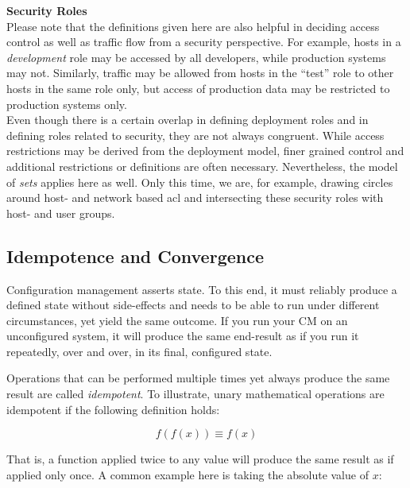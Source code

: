 \begin{sidenote}
{\bf Security Roles} \\

Please note that the definitions given here are also
helpful in deciding access control as well as traffic
flow from a security perspective.  For example, hosts
in a {\em development} role may be accessed by all
developers, while production systems may not.
Similarly, traffic may be allowed from hosts in the
``test'' role to other hosts in the same role only,
but access of production data may be restricted to
production systems only. \\ [10pt]

Even though there is a certain overlap in defining
deployment roles and in defining roles related to
security, they are not always congruent.  While access
restrictions may be derived from the deployment model,
finer grained control and additional restrictions or
definitions are often necessary.  Nevertheless, the
model of {\em sets} applies here as well.  Only this
time, we are, for example, drawing circles around
host- and network based \gls{acl} and intersecting these security roles with
host- and user groups.

\end{sidenote}


\subsection{Idempotence and Convergence}
\label{configuration-management:fighting-entropy:idempotence-convergence}

Configuration management asserts state.  To this end,
it must reliably produce a defined state without
side-effects and needs to be able to run under
different circumstances, yet yield the same outcome.
If you run your CM on an unconfigured system, it will
produce the same end-result as if you run it
repeatedly, over and over, in its final, configured
state.

Operations that can be performed multiple times yet
always produce the same result are called {\em
idempotent}.  To illustrate, unary mathematical
operations are idempotent if the following definition
holds:

\begin{displaymath}
f(f(x)) \equiv f(x)
\end{displaymath}

That is, a function applied twice to any value will
produce the same result as if applied only once.  A
common example here is taking the absolute value of
$x$:

